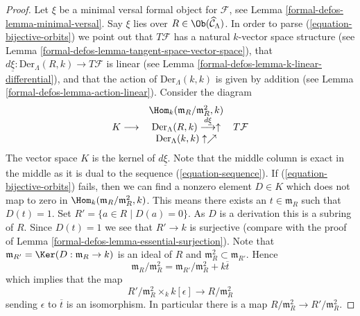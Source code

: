 \begin{proof}
Let $\xi$ be a minimal versal formal object for $\mathcal{F}$, see
Lemma \ref{formal-defos-lemma-minimal-versal}.
Say $\xi$ lies over $R \in \Ob(\widehat{\mathcal{C}}_\Lambda)$.
In order to parse (\ref{equation-bijective-orbits}) we point out
that $T\mathcal{F}$ has a natural $k$-vector space structure
(see
Lemma \ref{formal-defos-lemma-tangent-space-vector-space}),
that $d\underline{\xi} : \text{Der}_\Lambda(R, k) \to T\mathcal{F}$
is linear (see
Lemma \ref{formal-defos-lemma-k-linear-differential}),
and that the action of $\text{Der}_\Lambda(k, k)$ is
given by addition (see
Lemma \ref{formal-defos-lemma-action-linear}).
Consider the diagram
$$
\begin{array}{ccc} & \Hom_k(\mathfrak m_R/\mathfrak m_R^2, k) &  \\ K \longrightarrow & \text{Der}_\Lambda(R, k) \overset{d\underline{\xi}}{\longrightarrow}\uparrow & T\mathcal{F} \\  & \text{Der}_\Lambda(k, k) \uparrow\nearrow & \end{array}
$$
The vector space $K$ is the kernel of $d\underline{\xi}$.
Note that the middle column is exact in the middle as it is dual to the
sequence (\ref{equation-sequence}). If (\ref{equation-bijective-orbits})
fails, then we can find a nonzero element $D \in K$ which
does not map to zero in $\Hom_k(\mathfrak m_R/\mathfrak m_R^2, k)$.
This means there exists an $t \in \mathfrak m_R$ such that
$D(t) = 1$. Set $R' = \{a \in R \mid D(a) = 0\}$. As $D$ is a derivation
this is a subring of $R$. Since $D(t) = 1$ we see that $R' \to k$
is surjective (compare with the proof of
Lemma \ref{formal-defos-lemma-essential-surjection}).
Note that $\mathfrak m_{R'} = \Ker(D : \mathfrak m_R \to k)$
is an ideal of $R$ and $\mathfrak m_R^2 \subset \mathfrak m_{R'}$. Hence
$$
\mathfrak m_R/\mathfrak m_R^2 =
\mathfrak m_{R'}/\mathfrak m_R^2 + k\overline{t}
$$
which implies that the map
$$
R'/\mathfrak m_R^2 \times_k k[\epsilon] \to R/\mathfrak m_R^2
$$
sending $\epsilon$ to $\overline{t}$ is an isomorphism. In particular
there is a map $R/\mathfrak m_R^2 \to R'/\mathfrak m_R^2$.


\end{proof}
